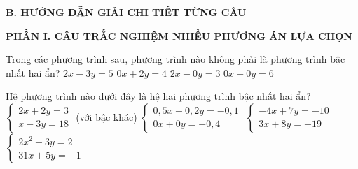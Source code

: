 \documentclass[12pt,a4paper]{article}
\begin{document}
\noindent\textbf{\large B. HƯỚNG DẪN GIẢI CHI TIẾT TỪNG CÂU}
\vspace{1mm}

\noindent\textbf{\large PHẦN I. CÂU TRẮC NGHIỆM NHIỀU PHƯƠNG ÁN LỰA CHỌN}
\vspace{1mm}
\begin{ex}
Trong các phương trình sau, phương trình nào không phải là phương trình bậc nhất hai ẩn?
\choice
{$2x - 3y = 5$}
{$0x + 2y = 4$}
{$2x - 0y = 3$}
{\True $0x - 0y = 6$}
\end{ex}

\begin{ex}
Hệ phương trình nào dưới đây là hệ hai phương trình bậc nhất hai ẩn?
\choice
{$\begin{cases} 2x + 2y = 3 \\ x - 3y = 18 \end{cases}$ (với bậc khác)}
{$\begin{cases} 0{,}5x - 0{,}2y = -0{,}1 \\ 0x + 0y = -0{,}4 \end{cases}$}
{\True $\begin{cases} -4x + 7y = -10 \\ 3x + 8y = -19 \end{cases}$}
{$\begin{cases} 2x^2 + 3y = 2 \\ 31x + 5y = -1 \end{cases}$}
\end{ex}
\end{document}
